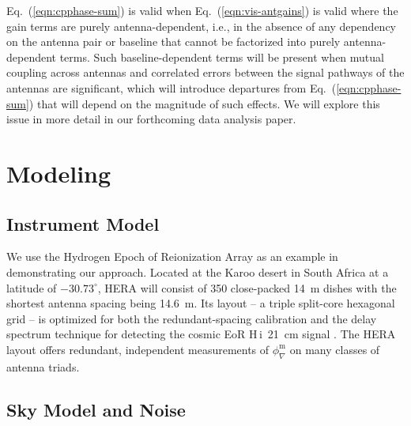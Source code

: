 \documentclass[
reprint,
superscriptaddress,
amsmath,
amssymb,
aps,
prd
]{revtex4-1}
\newcommand{\HI}{H\,{\sc i}}
\begin{document}

Eq.~(\ref{eqn:cpphase-sum}) is valid when Eq.~(\ref{eqn:vis-antgains}) is valid where the gain terms are purely antenna-dependent, i.e., in the absence of any dependency on the antenna pair or baseline that cannot be factorized into purely antenna-dependent terms. Such baseline-dependent terms will be present when mutual coupling across antennas and correlated errors between the signal pathways of the antennas are significant, which will introduce departures from Eq.~(\ref{eqn:cpphase-sum}) that will depend on the magnitude of such effects. We will explore this issue in more detail in our forthcoming data analysis paper. 

\section{Modeling}\label{sec:modeling}

\subsection{Instrument Model}\label{sec:instrument}

We use the Hydrogen Epoch of Reionization Array \cite[HERA;][]{deb17,thy16,ewa16,neb16,patra17} as an example in demonstrating our approach. Located at the Karoo desert in South Africa at a latitude of $-30.73^\circ$, HERA will consist of 350 close-packed 14~m dishes with the shortest antenna spacing being 14.6~m. Its layout -- a triple split-core hexagonal grid -- is optimized for both the redundant-spacing calibration and the delay spectrum technique for detecting the cosmic EoR \HI\ 21~cm signal \cite{dil16}. The HERA layout offers redundant, independent measurements of $\phi_\nabla^\textrm{m}$ on many classes of antenna triads. 

\subsection{Sky Model and Noise}\label{sec:skymodel-noise}
\end{document}
